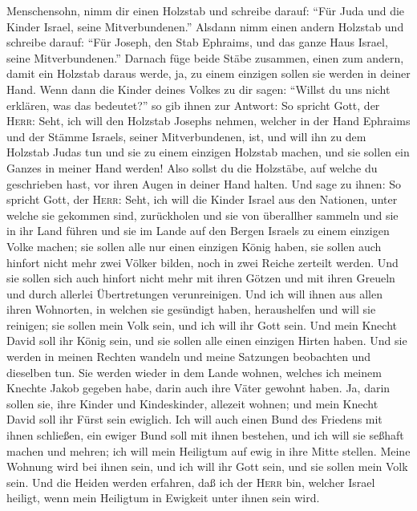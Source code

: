 Menschensohn, nimm dir einen Holzstab und schreibe darauf: ``Für Juda
und die Kinder Israel, seine Mitverbundenen.'' Alsdann nimm einen andern
Holzstab und schreibe darauf: ``Für Joseph, den Stab Ephraims, und das
ganze Haus Israel, seine Mitverbundenen.''  Darnach füge
beide Stäbe zusammen, einen zum andern, damit ein Holzstab daraus werde,
ja, zu einem einzigen sollen sie werden in deiner Hand. 
Wenn dann die Kinder deines Volkes zu dir sagen: ``Willst du uns nicht
erklären, was das bedeutet?''  so gib ihnen zur Antwort:
So spricht Gott, der \textsc{Herr}: Seht, ich will den Holzstab Josephs
nehmen, welcher in der Hand Ephraims und der Stämme Israels, seiner
Mitverbundenen, ist, und will ihn zu dem Holzstab Judas tun und sie zu
einem einzigen Holzstab machen, und sie sollen ein Ganzes in meiner Hand
werden!  Also sollst du die Holzstäbe, auf welche du
geschrieben hast, vor ihren Augen in deiner Hand halten. 
Und sage zu ihnen: So spricht Gott, der \textsc{Herr}: Seht, ich will
die Kinder Israel aus den Nationen, unter welche sie gekommen sind,
zurückholen und sie von überallher sammeln und sie in ihr Land führen
 und sie im Lande auf den Bergen Israels zu einem
einzigen Volke machen; sie sollen alle nur einen einzigen König haben,
sie sollen auch hinfort nicht mehr zwei Völker bilden, noch in zwei
Reiche zerteilt werden.  Und sie sollen sich auch hinfort
nicht mehr mit ihren Götzen und mit ihren Greueln und durch allerlei
Übertretungen verunreinigen. Und ich will ihnen aus allen ihren
Wohnorten, in welchen sie gesündigt haben, heraushelfen und will sie
reinigen; sie sollen mein Volk sein, und ich will ihr Gott sein.
 Und mein Knecht David soll ihr König sein, und sie
sollen alle einen einzigen Hirten haben. Und sie werden in meinen
Rechten wandeln und meine Satzungen beobachten und dieselben tun.
 Sie werden wieder in dem Lande wohnen, welches ich
meinem Knechte Jakob gegeben habe, darin auch ihre Väter gewohnt haben.
Ja, darin sollen sie, ihre Kinder und Kindeskinder, allezeit wohnen; und
mein Knecht David soll ihr Fürst sein ewiglich.  Ich will
auch einen Bund des Friedens mit ihnen schließen, ein ewiger Bund soll
mit ihnen bestehen, und ich will sie seßhaft machen und mehren; ich will
mein Heiligtum auf ewig in ihre Mitte stellen.  Meine
Wohnung wird bei ihnen sein, und ich will ihr Gott sein, und sie sollen
mein Volk sein.  Und die Heiden werden erfahren, daß ich
der \textsc{Herr} bin, welcher Israel heiligt, wenn mein Heiligtum in
Ewigkeit unter ihnen sein wird.

